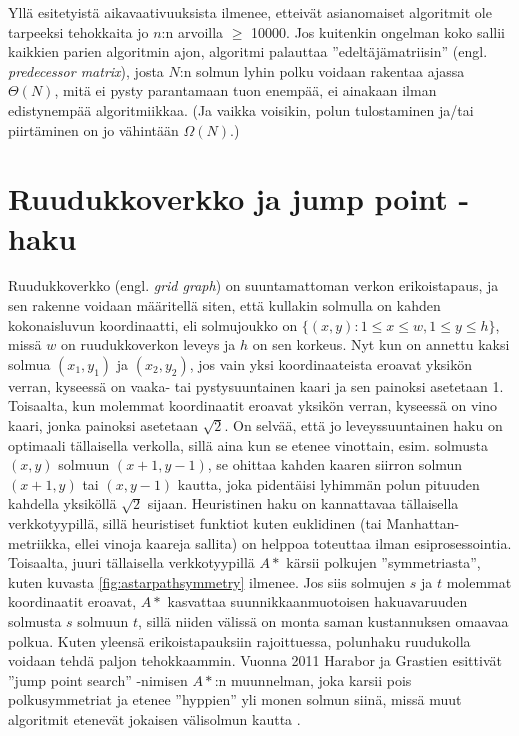 \documentclass[finnish]{tktltiki2}
\theoremstyle{definition}
\theoremstyle{remark}
\begin{document}
Yllä esitetyistä aikavaativuuksista ilmenee, etteivät asianomaiset algoritmit ole tarpeeksi tehokkaita jo $n$:n arvoilla $\geq$ 10000. Jos kuitenkin ongelman koko sallii kaikkien parien algoritmin ajon, algoritmi palauttaa ''edeltäjämatriisin'' (engl. \textit{predecessor matrix}), josta $N$:n solmun lyhin polku voidaan rakentaa ajassa $\Theta(N)$, mitä ei pysty parantamaan tuon enempää, ei ainakaan ilman edistynempää algoritmiikkaa. (Ja vaikka voisikin, polun tulostaminen ja/tai piirtäminen on jo vähintään $\Omega(N)$.)

\section{Ruudukkoverkko ja jump point -haku}
Ruudukkoverkko (engl. \textit{grid graph}) on suuntamattoman verkon erikoistapaus, ja sen rakenne voidaan määritellä siten, että kullakin solmulla on kahden kokonaisluvun koordinaatti, eli solmujoukko on $\{ (x, y) \colon 1 \leq x \leq w, 1 \leq y \leq h \}$, missä $w$ on ruudukkoverkon leveys ja $h$ on sen korkeus. Nyt kun on annettu kaksi solmua $(x_1, y_1)$ ja $(x_2, y_2)$, jos vain yksi koordinaateista eroavat yksikön verran, kyseessä on vaaka- tai pystysuuntainen kaari ja sen painoksi asetetaan 1. Toisaalta, kun molemmat koordinaatit eroavat yksikön verran, kyseessä on vino kaari, jonka painoksi asetetaan $\sqrt{2}$. On selvää, että jo leveyssuuntainen haku on optimaali tällaisella verkolla, sillä aina kun se etenee vinottain, esim. solmusta $(x, y)$ solmuun $(x + 1, y - 1)$, se ohittaa kahden kaaren siirron solmun $(x + 1, y)$ tai $(x, y - 1)$ kautta, joka pidentäisi lyhimmän polun pituuden kahdella yksiköllä $\sqrt{2}$ sijaan. Heuristinen haku on kannattavaa tällaisella verkkotyypillä, sillä heuristiset funktiot kuten euklidinen (tai Manhattan-metriikka, ellei vinoja kaareja sallita) on helppoa toteuttaa ilman esiprosessointia. Toisaalta, juuri tällaisella verkkotyypillä $A\ast$ kärsii polkujen ''symmetriasta'', kuten kuvasta \ref{fig:astarpathsymmetry} ilmenee. Jos siis solmujen $s$ ja $t$ molemmat koordinaatit eroavat, $A\ast$ kasvattaa suunnikkaanmuotoisen hakuavaruuden solmusta $s$ solmuun $t$, sillä niiden välissä on monta saman kustannuksen omaavaa polkua. Kuten yleensä erikoistapauksiin rajoittuessa, polunhaku ruudukolla voidaan tehdä paljon tehokkaammin. Vuonna 2011 Harabor ja Grastien esittivät ''jump point search'' -nimisen $A\ast$:n muunnelman, joka karsii pois polkusymmetriat ja etenee ''hyppien'' yli monen solmun siinä, missä muut algoritmit etenevät jokaisen välisolmun kautta \cite{Harabor11}.
\end{document}
